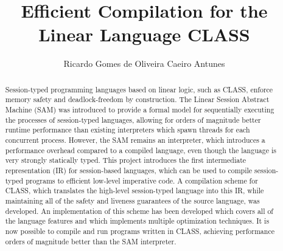 \documentclass[sigconf,nonacm,natbib=true]{acmart}
\begin{document}

\title{Efficient Compilation for the Linear Language CLASS}

\author{Ricardo Gomes de Oliveira Caeiro Antunes}

\renewcommand{\shortauthors}{Ricardo Antunes}

\begin{abstract}
  Session-typed programming languages based on linear logic, such as CLASS, enforce memory safety and deadlock-freedom by construction. The Linear Session Abstract Machine (SAM) was introduced to provide a formal model for sequentially executing the processes of session-typed languages, allowing for orders of magnitude better runtime performance than existing interpreters which spawn threads for each concurrent process. However, the SAM remains an interpreter, which introduces a performance overhead compared to a compiled language, even though the language is very strongly statically typed. This project introduces the first intermediate representation (IR) for session-based languages, which can be used to compile session-typed programs to efficient low-level imperative code. A compilation scheme for CLASS, which translates the high-level session-typed language into this IR, while maintaining all of the safety and liveness guarantees of the source language, was developed. An implementation of this scheme has been developed which covers all of the language features and which implements multiple optimization techniques. It is now possible to compile and run programs written in CLASS, achieving performance orders of magnitude better than the SAM interpreter.
\end{abstract}
\end{document}
